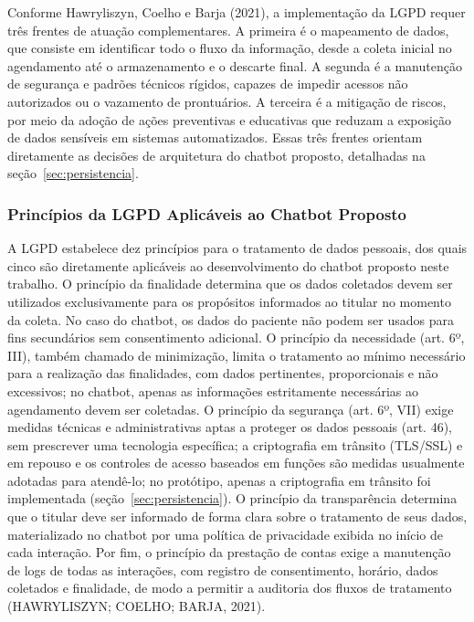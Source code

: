 \documentclass[12pt,a4paper]{extarticle}
\begin{document}
Conforme Hawryliszyn, Coelho e Barja (2021), a implementação da LGPD requer três frentes de atuação complementares. A primeira é o mapeamento de dados, que consiste em identificar todo o fluxo da informação, desde a coleta inicial no agendamento até o armazenamento e o descarte final. A segunda é a manutenção de segurança e padrões técnicos rígidos, capazes de impedir acessos não autorizados ou o vazamento de prontuários. A terceira é a mitigação de riscos, por meio da adoção de ações preventivas e educativas que reduzam a exposição de dados sensíveis em sistemas automatizados. Essas três frentes orientam diretamente as decisões de arquitetura do chatbot proposto, detalhadas na seção~\ref{sec:persistencia}.

\subsubsection{Princípios da LGPD Aplicáveis ao Chatbot Proposto}

A LGPD estabelece dez princípios para o tratamento de dados pessoais, dos quais cinco são diretamente aplicáveis ao desenvolvimento do chatbot proposto neste trabalho. O princípio da finalidade determina que os dados coletados devem ser utilizados exclusivamente para os propósitos informados ao titular no momento da coleta. No caso do chatbot, os dados do paciente não podem ser usados para fins secundários sem consentimento adicional. O princípio da necessidade (art. 6º, III), também chamado de minimização, limita o tratamento ao mínimo necessário para a realização das finalidades, com dados pertinentes, proporcionais e não excessivos; no chatbot, apenas as informações estritamente necessárias ao agendamento devem ser coletadas. O princípio da segurança (art. 6º, VII) exige medidas técnicas e administrativas aptas a proteger os dados pessoais (art. 46), sem prescrever uma tecnologia específica; a criptografia em trânsito (TLS/SSL) e em repouso e os controles de acesso baseados em funções são medidas usualmente adotadas para atendê-lo; no protótipo, apenas a criptografia em trânsito foi implementada (seção~\ref{sec:persistencia}). O princípio da transparência determina que o titular deve ser informado de forma clara sobre o tratamento de seus dados, materializado no chatbot por uma política de privacidade exibida no início de cada interação. Por fim, o princípio da prestação de contas exige a manutenção de logs de todas as interações, com registro de consentimento, horário, dados coletados e finalidade, de modo a permitir a auditoria dos fluxos de tratamento (HAWRYLISZYN; COELHO; BARJA, 2021).
\end{document}
